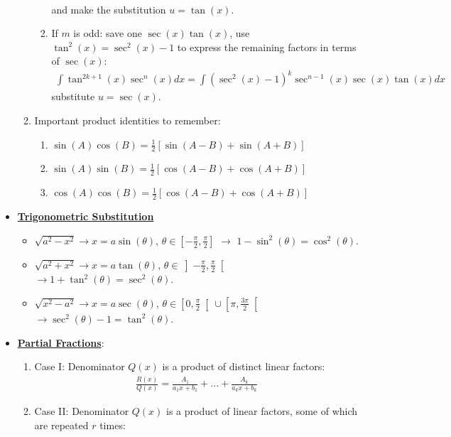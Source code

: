 \documentclass[11pt]{article}
\newcommand{\dfn}[1]{\underline{\textbf{#1}}}
\begin{document}
\begin{itemize}[noitemsep]
\begin{enumerate}[noitemsep]
\begin{enumerate}[noitemsep]
\begin{align}
			\end{align}
			and make the substitution $u= \tan(x)$. 
			\item If $m$ is odd: save one $\sec(x) \tan(x)$, use $\tan^2(x) = \sec^2(x) - 1$ to express the remaining factors in terms of $\sec(x)$: 
			\begin{align}
				\int \tan^{2k+1} (x) \sec^n(x) dx = \int ( \sec^2(x) - 1)^k \sec^{n-1}(x) \sec(x) \tan(x) dx 	
			\end{align}
			substitute $u= \sec(x)$. 
		\end{enumerate}
	\item Important product identities to remember: 
	\begin{enumerate}[noitemsep]
		\item $\sin (A) \cos (B) = \frac{1}{2} [ \sin (A-B) + \sin (A+B) ]$
		\item $\sin (A) \sin (B) = \frac{1}{2} [ \cos (A-B) + \cos (A+B) ]$ 
		\item $\cos (A) \cos (B) = \frac{1}{2} [ \cos (A-B) + \cos (A+B) ]$
	\end{enumerate}
	\end{enumerate}
	\item \dfn{Trigonometric Substitution} 
	\begin{itemize}[noitemsep]
		\item $\sqrt{a^2 - x^2} \rightarrow x = a \sin ( \theta)$, $\theta \in \left[ - \frac{\pi}{2}, \frac{\pi}{2} \right]$ $\rightarrow$ $1 - \sin^2 (\theta ) = \cos^2 (\theta)$. 
		\item $\sqrt{a^2 + x^2} \rightarrow x = a \tan ( \theta)$, $ \theta \in \left] - \frac{\pi}{2}, \frac{\pi}{2} \right[$ $\rightarrow 1 + \tan^2 (\theta) = \sec^2 (\theta)$. 
		\item $\sqrt{x^2 - a^2} \rightarrow x = a \sec (\theta)$, $ \theta \in \left[ 0, \frac{\pi}{2} \right[ \cup \left[ \pi, \frac{3 \pi}{2} \right[$ $\rightarrow \sec^2 (\theta) - 1 = \tan^2(\theta)$. 
	\end{itemize}
	\item \dfn{Partial Fractions}: 
	\begin{enumerate}[noitemsep]
		\item Case I: Denominator $Q(x)$ is a product of distinct linear factors: 
		\begin{align}
			\frac{R(x)}{Q(x)} = \frac{A_1}{a_1x+b_1} + ... + \frac{A_k}{a_k x + b_k}	
		\end{align}
		\item Case II: Denominator $Q(x)$ is a product of linear factors, some of which are repeated $r$ times: 

\end{enumerate}
\end{itemize}
\end{document}
